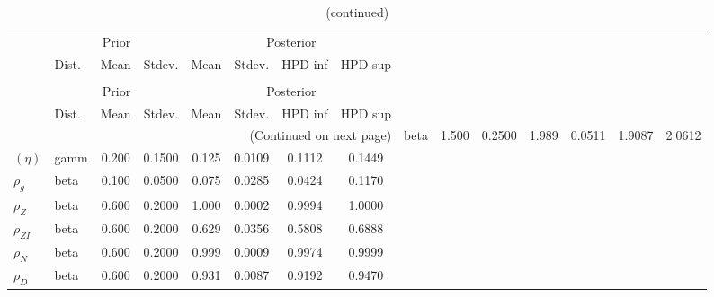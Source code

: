  
\begin{center}
\begin{longtable}{llcccccc} 
\caption{Results from Metropolis-Hastings (parameters)}
 \label{Table:MHPosterior:1}\\
\toprule 
  & \multicolumn{3}{c}{Prior}  &  \multicolumn{4}{c}{Posterior} \\
  \cmidrule(r{.75em}){2-4} \cmidrule(r{.75em}){5-8}
  & Dist. & Mean  & Stdev. & Mean & Stdev. & HPD inf & HPD sup\\
\midrule \endfirsthead 
\caption{(continued)}\\\toprule 
  & \multicolumn{3}{c}{Prior}  &  \multicolumn{4}{c}{Posterior} \\
  \cmidrule(r{.75em}){2-4} \cmidrule(r{.75em}){5-8}
  & Dist. & Mean  & Stdev. & Mean & Stdev. & HPD inf & HPD sup\\
\midrule \endhead 
\bottomrule \multicolumn{8}{r}{(Continued on next page)} \endfoot 
\bottomrule \endlastfoot 
${\gamma}$ & beta &   1.500 & 0.2500 &   1.989& 0.0511 &  1.9087 &  2.0612 \\ 
$(\eta)$ & gamm &   0.200 & 0.1500 &   0.125& 0.0109 &  0.1112 &  0.1449 \\ 
${\rho_g}$ & beta &   0.100 & 0.0500 &   0.075& 0.0285 &  0.0424 &  0.1170 \\ 
${\rho_Z}$ & beta &   0.600 & 0.2000 &   1.000& 0.0002 &  0.9994 &  1.0000 \\ 
${\rho_{ZI}}$ & beta &   0.600 & 0.2000 &   0.629& 0.0356 &  0.5808 &  0.6888 \\ 
${\rho_N}$ & beta &   0.600 & 0.2000 &   0.999& 0.0009 &  0.9974 &  0.9999 \\ 
${\rho_D}$ & beta &   0.600 & 0.2000 &   0.931& 0.0087 &  0.9192 &  0.9470 \\ 
\end{longtable}
 \end{center}
